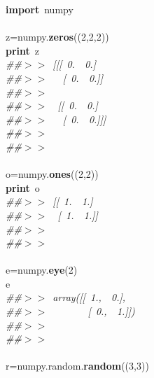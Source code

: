 \noindent
\mbox{}\textbf{import}\ numpy \\
\mbox{} \\
\mbox{}z=numpy.\textbf{zeros}((2,2,2)) \\
\mbox{}\textbf{print}\ z \\
\mbox{}\textit{\#\#$>$$>$\ [[[\ 0.\ \ 0.]} \\
\mbox{}\textit{\#\#$>$$>$\ \ \ [\ 0.\ \ 0.]]} \\
\mbox{}\textit{\#\#$>$$>$\ } \\
\mbox{}\textit{\#\#$>$$>$\ \ [[\ 0.\ \ 0.]} \\
\mbox{}\textit{\#\#$>$$>$\ \ \ [\ 0.\ \ 0.]]]} \\
\mbox{}\textit{\#\#$>$$>$\ } \\
\mbox{}\textit{\#\#$>$$>$\ } \\
\mbox{} \\
\mbox{}o=numpy.\textbf{ones}((2,2)) \\
\mbox{}\textbf{print}\ o \\
\mbox{}\textit{\#\#$>$$>$\ [[\ 1.\ \ 1.]} \\
\mbox{}\textit{\#\#$>$$>$\ \ [\ 1.\ \ 1.]]} \\
\mbox{}\textit{\#\#$>$$>$\ } \\
\mbox{}\textit{\#\#$>$$>$\ } \\
\mbox{} \\
\mbox{}e=numpy.\textbf{eye}(2) \\
\mbox{}e \\
\mbox{}\textit{\#\#$>$$>$\ array([[\ 1.,\ \ 0.],} \\
\mbox{}\textit{\#\#$>$$>$\ \ \ \ \ \ \ \ [\ 0.,\ \ 1.]])} \\
\mbox{}\textit{\#\#$>$$>$\ } \\
\mbox{}\textit{\#\#$>$$>$\ } \\
\mbox{} \\
\mbox{}r=numpy.random.\textbf{random}((3,3)) \\
\mbox{} \\
\mbox{}